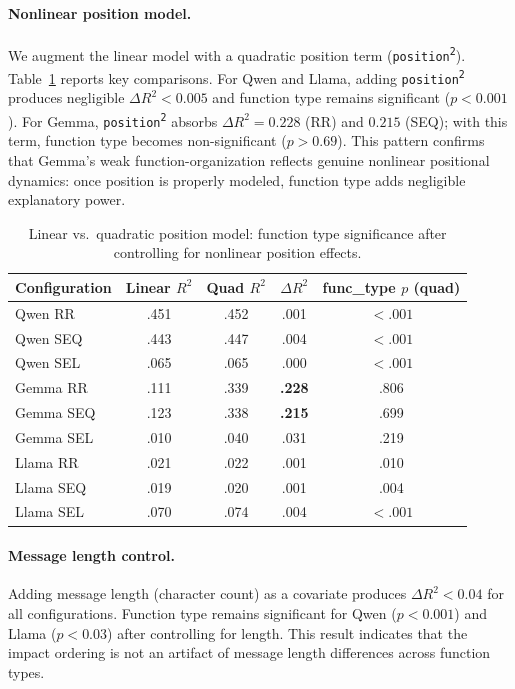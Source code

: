 \paragraph{Nonlinear position model.} We augment the linear model with a quadratic position term (\texttt{position\textsuperscript{2}}). Table~\ref{tab:nonlinear} reports key comparisons. For Qwen and Llama, adding \texttt{position\textsuperscript{2}} produces negligible $\Delta R^2 < 0.005$ and function type remains significant ($p < 0.001$). For Gemma, \texttt{position\textsuperscript{2}} absorbs $\Delta R^2 = 0.228$ (RR) and $0.215$ (SEQ); with this term, function type becomes non-significant ($p > 0.69$). This pattern confirms that Gemma's weak function-organization reflects genuine nonlinear positional dynamics: once position is properly modeled, function type adds negligible explanatory power.

\begin{table}[htbp]
\centering
\caption{Linear vs.\ quadratic position model: function type significance after controlling for nonlinear position effects.}
\label{tab:nonlinear}
\small
\begin{tabular}{lcccc}
\toprule
\textbf{Configuration} & \textbf{Linear $R^2$} & \textbf{Quad $R^2$} & \textbf{$\Delta R^2$} & \textbf{func\_type $p$ (quad)} \\
\midrule
Qwen RR    & .451 & .452 & .001 & $< .001$ \\
Qwen SEQ   & .443 & .447 & .004 & $< .001$ \\
Qwen SEL   & .065 & .065 & .000 & $< .001$ \\
Gemma RR   & .111 & .339 & \textbf{.228} & .806 \\
Gemma SEQ  & .123 & .338 & \textbf{.215} & .699 \\
Gemma SEL  & .010 & .040 & .031 & .219 \\
Llama RR   & .021 & .022 & .001 & .010 \\
Llama SEQ  & .019 & .020 & .001 & .004 \\
Llama SEL  & .070 & .074 & .004 & $< .001$ \\
\bottomrule
\end{tabular}
\end{table}

\paragraph{Message length control.} Adding message length (character count) as a covariate produces $\Delta R^2 < 0.04$ for all configurations. Function type remains significant for Qwen ($p < 0.001$) and Llama ($p < 0.03$) after controlling for length. This result indicates that the impact ordering is not an artifact of message length differences across function types.

